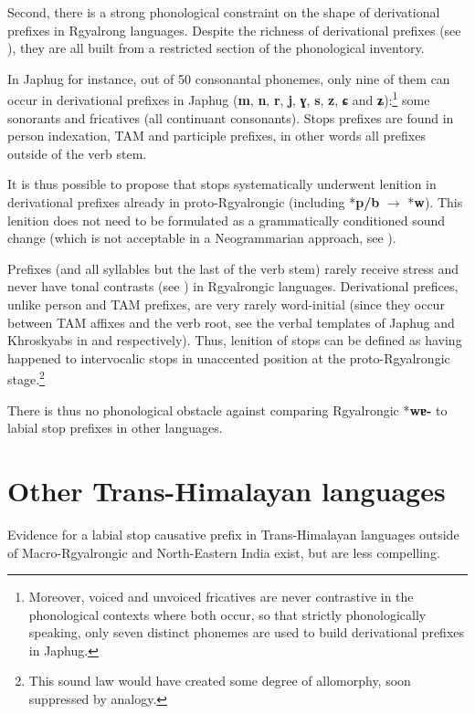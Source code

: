 \documentclass[oneside,a4paper,11pt]{article}
\newcommand{\ipa}[1]{\textbf{{\phon\mbox{#1}}}} %
\begin{document}
Second, there is a strong phonological constraint on the shape of derivational prefixes in Rgyalrong languages. Despite the richness of derivational prefixes (see \citealt{jackson14morpho, jacques14antipassive}), they are all built from a restricted section of the phonological inventory.

In Japhug for instance, out of 50 consonantal phonemes, only nine of them can occur in derivational prefixes in Japhug (\ipa{m}, \ipa{n}, \ipa{r}, \ipa{j}, \ipa{ɣ}, \ipa{s}, \ipa{z}, \ipa{ɕ} and \ipa{ʑ}):\footnote{Moreover, voiced and unvoiced fricatives are never contrastive in the phonological contexts where both occur, so that strictly phonologically speaking, only seven distinct phonemes are used to build derivational prefixes in Japhug.} some sonorants and fricatives (all continuant consonants). Stops prefixes are found in person indexation, TAM and participle prefixes, in other words all prefixes outside of the verb stem. 

It is thus possible to propose that stops systematically underwent lenition in derivational prefixes already in proto-Rgyalrongic (including *\ipa{p/b} $\rightarrow$ *\ipa{w}). This lenition does not need to be formulated as a grammatically conditioned sound change (which is not acceptable in a Neogrammarian approach, see \citealt{hill14conditioned}). 

Prefixes (and all syllables but the last of the verb stem) rarely receive stress and never have tonal contrasts (see \citealt{jackson05yingao}) in Rgyalrongic languages. Derivational prefices, unlike person and TAM prefixes, are very rarely word-initial (since they occur between TAM affixes and the verb root, see the verbal templates of Japhug and Khroskyabs in \citealt{jacques13harmonization} and \citealt{lai15person} respectively). Thus, lenition of stops can be defined as having happened to intervocalic stops in unaccented position at the proto-Rgyalrongic stage.\footnote{This sound law would have created some degree of allomorphy, soon suppressed by analogy.}

There is thus no phonological obstacle against comparing Rgyalrongic *\ipa{wɐ-} to labial stop prefixes in other languages.

 \section{Other Trans-Himalayan languages} 
Evidence for a labial stop causative  prefix in Trans-Himalayan languages outside of Macro-Rgyalrongic and North-Eastern India exist, but are less compelling.
\end{document}
